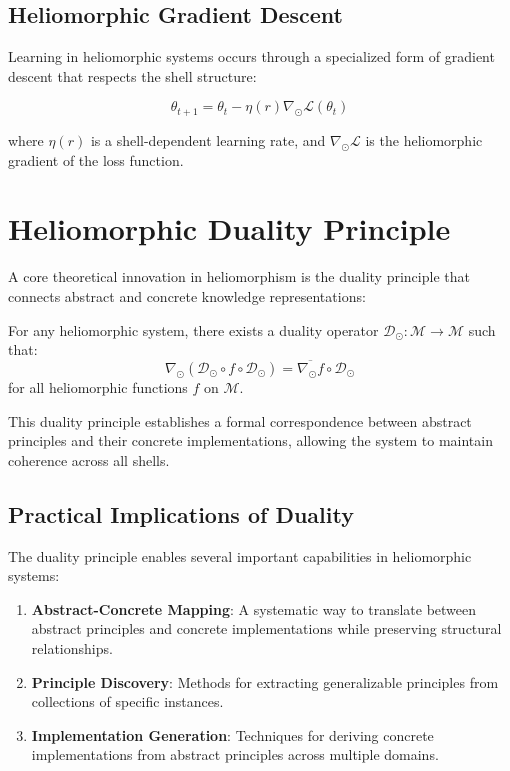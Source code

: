 \subsection{Heliomorphic Gradient Descent}

Learning in heliomorphic systems occurs through a specialized form of gradient descent that respects the shell structure:

\begin{equation}
\theta_{t+1} = \theta_t - \eta(r) \nabla_{\odot} \mathcal{L}(\theta_t)
\end{equation}

where $\eta(r)$ is a shell-dependent learning rate, and $\nabla_{\odot} \mathcal{L}$ is the heliomorphic gradient of the loss function.

\section{Heliomorphic Duality Principle}

A core theoretical innovation in heliomorphism is the duality principle that connects abstract and concrete knowledge representations:

\begin{theorem}
For any heliomorphic system, there exists a duality operator $\mathcal{D}_{\odot}: \mathcal{M} \rightarrow \mathcal{M}$ such that:
\begin{equation}
\nabla_{\odot} (\mathcal{D}_{\odot} \circ f \circ \mathcal{D}_{\odot}) = \overline{\nabla_{\odot} f} \circ \mathcal{D}_{\odot}
\end{equation}
for all heliomorphic functions $f$ on $\mathcal{M}$.
\end{theorem}

This duality principle establishes a formal correspondence between abstract principles and their concrete implementations, allowing the system to maintain coherence across all shells.

\subsection{Practical Implications of Duality}

The duality principle enables several important capabilities in heliomorphic systems:

\begin{enumerate}
    \item \textbf{Abstract-Concrete Mapping}: A systematic way to translate between abstract principles and concrete implementations while preserving structural relationships.
    
    \item \textbf{Principle Discovery}: Methods for extracting generalizable principles from collections of specific instances.
    
    \item \textbf{Implementation Generation}: Techniques for deriving concrete implementations from abstract principles across multiple domains.
\end{enumerate}

